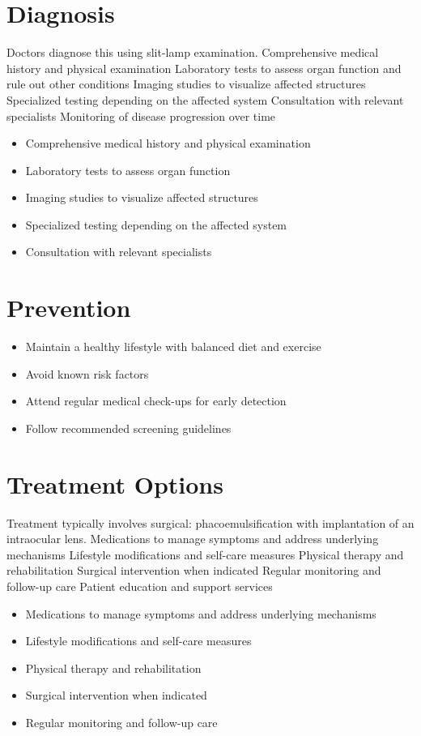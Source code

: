 \section{Diagnosis}
Doctors diagnose this using slit-lamp examination. Comprehensive medical history and physical examination Laboratory tests to assess organ function and rule out other conditions Imaging studies to visualize affected structures Specialized testing depending on the affected system Consultation with relevant specialists Monitoring of disease progression over time

\begin{itemize}[noitemsep]
  \item Comprehensive medical history and physical examination
  \item Laboratory tests to assess organ function
  \item Imaging studies to visualize affected structures
  \item Specialized testing depending on the affected system
  \item Consultation with relevant specialists
\end{itemize}
\section{Prevention}
\begin{itemize}[noitemsep]
  \item Maintain a healthy lifestyle with balanced diet and exercise
  \item Avoid known risk factors
  \item Attend regular medical check-ups for early detection
  \item Follow recommended screening guidelines
\end{itemize}
\section{Treatment Options}
Treatment typically involves surgical: phacoemulsification with implantation of an intraocular lens. Medications to manage symptoms and address underlying mechanisms Lifestyle modifications and self-care measures Physical therapy and rehabilitation Surgical intervention when indicated Regular monitoring and follow-up care Patient education and support services

\begin{itemize}[noitemsep]
  \item Medications to manage symptoms and address underlying mechanisms
  \item Lifestyle modifications and self-care measures
  \item Physical therapy and rehabilitation
  \item Surgical intervention when indicated
  \item Regular monitoring and follow-up care
\end{itemize}
